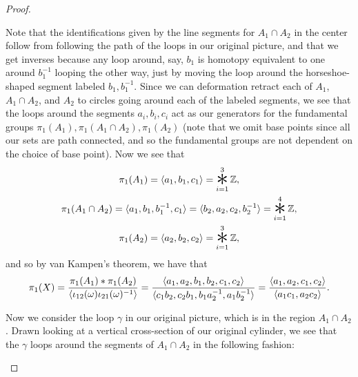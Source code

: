 \documentclass[12pt]{article}
\theoremstyle{remark}
\DeclareMathOperator*{\bigast}{\raisebox{-0.6ex}{\scalebox{2.5}{$\ast$}}}
\begin{document}
\begin{proof}
\begin{center}
  \end{center}
  Note that the identifications given by the line segments for $A_1 \cap A_2$ in the center follow from following the path of the loops in our original picture, and that we get inverses because any loop around, say, $b_1$ is homotopy equivalent to one around $b_1^{-1}$ looping the other way, just by moving the loop around the horseshoe-shaped segment labeled $b_1,b_1^{-1}$. Since we can deformation retract each of $A_1$, $A_1 \cap A_2$, and $A_2$ to circles going around each of the labeled segments, we see that the loops around the segments $a_i,b_i,c_i$ act as our generators for the fundamental groups $\pi_1(A_1),\pi_1(A_1 \cap A_2),\pi_1(A_2)$ (note that we omit base points since all our sets are path connected, and so the fundamental groups are not dependent on the choice of base point). Now we see that
  \begin{gather*}
    \pi_1(A_1) = \braket{a_1,b_1,c_1} = \bigast_{i=1}^3 \mathbb{Z},\\
    \pi_1(A_1 \cap A_2) = \braket{a_1,b_1,b_1^{-1},c_1} = \braket{b_2,a_2,c_2,b_2^{-1}} = \bigast_{i=1}^4 \mathbb{Z},\\
    \pi_1(A_2) = \braket{a_2,b_2,c_2} = \bigast_{i=1}^3 \mathbb{Z},
  \end{gather*}
  and so by van Kampen's theorem, we have that
  \begin{equation*}
    \pi_1(X) = \frac{\pi_1(A_1) \ast \pi_1(A_2)}{\braket{\iota_{12}(\omega)\iota_{21}(\omega)^{-1}}} = \frac{\braket{a_1,a_2,b_1,b_2,c_1,c_2}}{\braket{c_1b_2,c_2b_1,b_1a_2^{-1},a_1b_2^{-1}}} = \frac{\braket{a_1,a_2,c_1,c_2}}{\braket{a_1c_1,a_2c_2}}.
  \end{equation*}
  \par Now we consider the loop $\gamma$ in our original picture, which is in the region $A_1 \cap A_2$. Drawn looking at a vertical cross-section of our original cylinder, we see that the $\gamma$ loops around the segments of $A_1 \cap A_2$ in the following fashion:
  \begin{center}
\end{center}
\end{proof}
\end{document}
